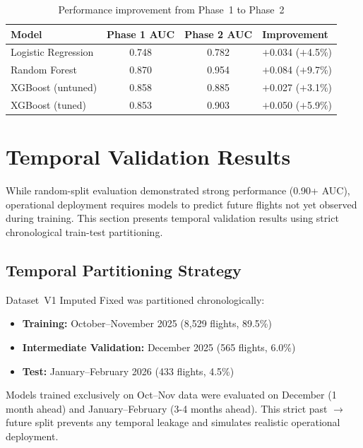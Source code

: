 \documentclass{report}
\begin{document}
\begin{table}[H]
\centering
\caption{Performance improvement from Phase~1 to Phase~2}
\label{tab:phase_comp}
\begin{tabular}{lccl}
\toprule
\textbf{Model} & \textbf{Phase 1 AUC} & \textbf{Phase 2 AUC} &
  \textbf{Improvement} \\
\midrule
Logistic Regression & 0.748 & 0.782 & $+$0.034 ($+$4.5\%) \\
Random Forest       & 0.870 & 0.954 & $+$0.084 ($+$9.7\%) \\
XGBoost (untuned)   & 0.858 & 0.885 & $+$0.027 ($+$3.1\%) \\
XGBoost (tuned)     & 0.853 & 0.903 & $+$0.050 ($+$5.9\%) \\
\bottomrule
\end{tabular}
\end{table}

\section{Temporal Validation Results}
\label{sec:temporal_val}

While random-split evaluation demonstrated strong performance (0.90+ AUC),
operational deployment requires models to predict future flights not yet
observed during training.  This section presents temporal validation results
using strict chronological train-test partitioning.

\subsection{Temporal Partitioning Strategy}

Dataset~V1 Imputed Fixed was partitioned chronologically:

\begin{itemize}
\item \textbf{Training:} October--November 2025 (8,529 flights, 89.5\%)
\item \textbf{Intermediate Validation:} December 2025 (565 flights, 6.0\%)
\item \textbf{Test:} January--February 2026 (433 flights, 4.5\%)
\end{itemize}

Models trained exclusively on Oct--Nov data were evaluated on December
(1 month ahead) and January--February (3-4 months ahead).  This strict
past $\to$ future split prevents any temporal leakage and simulates
realistic operational deployment.
\end{document}

